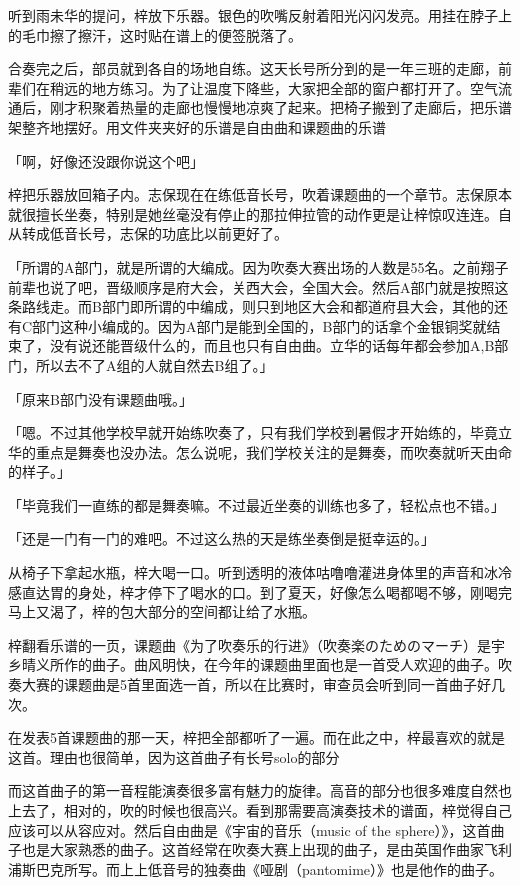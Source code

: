 \documentclass[UTF8]{ctexart}
\begin{document}
    听到雨未华的提问，梓放下乐器。银色的吹嘴反射着阳光闪闪发亮。用挂在脖子上的毛巾擦了擦汗，这时贴在谱上的便签脱落了。

    合奏完之后，部员就到各自的场地自练。这天长号所分到的是一年三班的走廊，前辈们在稍远的地方练习。为了让温度下降些，大家把全部的窗户都打开了。空气流通后，刚才积聚着热量的走廊也慢慢地凉爽了起来。把椅子搬到了走廊后，把乐谱架整齐地摆好。用文件夹夹好的乐谱是自由曲和课题曲的乐谱

    「啊，好像还没跟你说这个吧」

    梓把乐器放回箱子内。志保现在在练低音长号，吹着课题曲的一个章节。志保原本就很擅长坐奏，特别是她丝毫没有停止的那拉伸拉管的动作更是让梓惊叹连连。自从转成低音长号，志保的功底比以前更好了。

    「所谓的A部门，就是所谓的大编成。因为吹奏大赛出场的人数是55名。之前翔子前辈也说了吧，晋级顺序是府大会，关西大会，全国大会。然后A部门就是按照这条路线走。而B部门即所谓的中编成，则只到地区大会和都道府县大会，其他的还有C部门这种小编成的。因为A部门是能到全国的，B部门的话拿个金银铜奖就结束了，没有说还能晋级什么的，而且也只有自由曲。立华的话每年都会参加A,B部门，所以去不了A组的人就自然去B组了。」

    「原来B部门没有课题曲哦。」

    「嗯。不过其他学校早就开始练吹奏了，只有我们学校到暑假才开始练的，毕竟立华的重点是舞奏也没办法。怎么说呢，我们学校关注的是舞奏，而吹奏就听天由命的样子。」

    「毕竟我们一直练的都是舞奏嘛。不过最近坐奏的训练也多了，轻松点也不错。」

    「还是一门有一门的难吧。不过这么热的天是练坐奏倒是挺幸运的。」

    从椅子下拿起水瓶，梓大喝一口。听到透明的液体咕噜噜灌进身体里的声音和冰冷感直达胃的身处，梓才停下了喝水的口。到了夏天，好像怎么喝都喝不够，刚喝完马上又渴了，梓的包大部分的空间都让给了水瓶。

    梓翻看乐谱的一页，课题曲《为了吹奏乐的行进》（吹奏楽のためのマーチ）是宇乡晴义所作的曲子。曲风明快，在今年的课题曲里面也是一首受人欢迎的曲子。吹奏大赛的课题曲是5首里面选一首，所以在比赛时，审查员会听到同一首曲子好几次。

    在发表5首课题曲的那一天，梓把全部都听了一遍。而在此之中，梓最喜欢的就是这首。理由也很简单，因为这首曲子有长号solo的部分

    而这首曲子的第一音程能演奏很多富有魅力的旋律。高音的部分也很多难度自然也上去了，相对的，吹的时候也很高兴。看到那需要高演奏技术的谱面，梓觉得自己应该可以从容应对。然后自由曲是《宇宙的音乐（music of the sphere）》，这首曲子也是大家熟悉的曲子。这首经常在吹奏大赛上出现的曲子，是由英国作曲家飞利浦斯巴克所写。而上上低音号的独奏曲《哑剧（pantomime）》也是他作的曲子。
\end{document}
